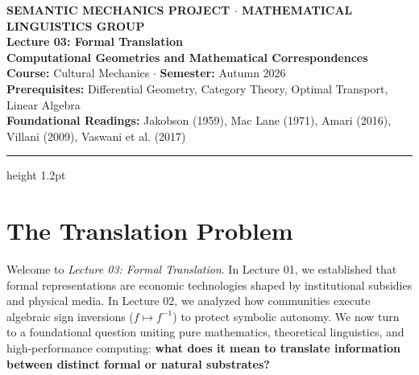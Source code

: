 \documentclass[11pt,letterpaper]{article}
\begin{document}
\begin{center}
    {\small\sffamily\bfseries\color{darkslate} SEMANTIC MECHANICS PROJECT $\cdot$ MATHEMATICAL LINGUISTICS GROUP}\\[0.7em]
    {\LARGE\bfseries\color{primaryblue} Lecture 03: Formal Translation}\\[0.35em]
    {\Large\bfseries\color{primaryblue} Computational Geometries and Mathematical Correspondences}\\[0.4em]
    {\normalsize\sffamily\color{darkslate} \textbf{Course:} Cultural Mechanics $\cdot$ \textbf{Semester:} Autumn 2026}\\[0.25em]
    {\small\sffamily\color{darkslate!80} \textbf{Prerequisites:} Differential Geometry, Category Theory, Optimal Transport, Linear Algebra}\\[0.25em]
    {\small\sffamily\color{darkslate!80} \textbf{Foundational Readings:} Jakobson (1959), Mac Lane (1971), Amari (2016), Villani (2009), Vaswani et al. (2017)}
\end{center}
\vspace{0.1em}
\hrule height 1.2pt \vspace{0.7em}

\section{The Translation Problem}

Welcome to \textit{Lecture 03: Formal Translation}. In Lecture 01, we established that formal representations are economic technologies shaped by institutional subsidies and physical media. In Lecture 02, we analyzed how communities execute algebraic sign inversions ($f \mapsto f^{-1}$) to protect symbolic autonomy. We now turn to a foundational question uniting pure mathematics, theoretical linguistics, and high-performance computing: \textbf{what does it mean to translate information between distinct formal or natural substrates?}
\end{document}
